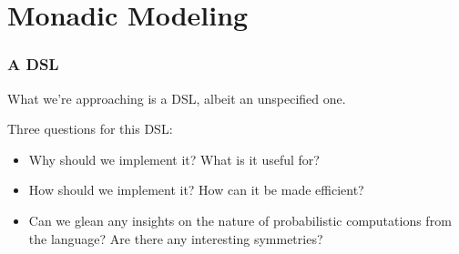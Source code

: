 \documentclass[usenames,dvipsnames]{beamer}
\begin{document}
\section{Monadic Modeling}
\begin{frame}
  \frametitle{A DSL}
  What we're approaching is a DSL, albeit an unspecified one.

  \pause
  Three questions for this DSL:
  \pause
  \begin{itemize}
    \item Why should we implement it? What is it useful for?
    \pause
    \item How should we implement it? How can it be made efficient? 
    \pause
    \item Can we glean any insights on the nature of probabilistic computations
      from the language? Are there any interesting symmetries?
  \end{itemize}
\end{frame}
\end{document}

